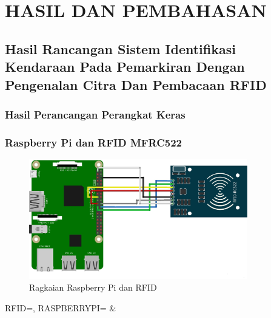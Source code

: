 \chapter{HASIL DAN PEMBAHASAN}

\section{Hasil Rancangan Sistem Identifikasi Kendaraan Pada Pemarkiran Dengan Pengenalan Citra Dan Pembacaan RFID}

\subsection{Hasil Perancangan Perangkat Keras}

\subsection{Raspberry Pi dan RFID MFRC522}
\begin{figure} [H]
    \includegraphics[width=0.85\textwidth, center]{images/skematik_rfid.jpg}
    \caption{Ragkaian Raspberry Pi dan RFID}
    \label{fig:skematikRfid}
\end{figure}

\begin{atable}
    \caption{Rangkaian pin RFID ke Raspberry Pi}
    \label{table:tableRfid}
        {
            RFID=\RFID, 
            RASPBERRYPI=\RASPBERRYPI}
        {
            \RFID & 
            \RASPBERRYPI}
\end{atable}


